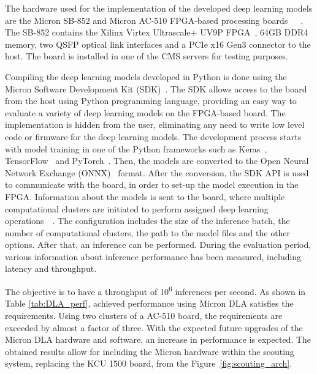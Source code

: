 \documentclass[10pt, paper=a4, UKenglish]{article}
\begin{document}
The hardware used for the implementation of the developed deep learning models are the Micron SB-852 and Micron AC-510 FPGA-based processing boards~\cite{micron_company}~\cite{micron_sb852}~\cite{micron_ac510}. The SB-852 contains the Xilinx Virtex Ultrascale+ UV9P FPGA~\cite{vu9p}, 64GB DDR4 memory, two QSFP optical link interfaces and a PCIe x16 Gen3 connector to the host. The board is installed in one of the CMS servers for testing purposes.

Compiling the deep learning models developed in Python is done using the Micron Software Development Kit (SDK)~\cite{micron_sdk}. The SDK allows access to the board from the host using Python programming language, providing an easy way to evaluate a variety of deep learning models on the FPGA-based board. The implementation is hidden from the user, eliminating any need to write low level code or firmware for the deep learning models. The development process starts with model training in one of the Python frameworks such as Keras~\cite{keras}, TensorFlow~\cite{tf} and PyTorch~\cite{pytorch}. Then, the models are converted to the Open Neural Network Exchange (ONNX)~\cite{onnx} format. After the conversion, the SDK API is used to communicate with the board, in order to set-up the model execution in the FPGA. Information about the models is sent to the board, where multiple computational clusters are initiated to perform assigned deep learning operations~\cite{mircon_paper_1}~\cite{mircon_paper_2}. The configuration includes the size of the inference batch, the number of computational clusters, the path to the model files and the other options. After that, an inference can be performed. During the evaluation period, various information about inference performance has been measured, including latency and throughput.

The objective is to have a throughput of 10\textsuperscript{6} inferences per second. As shown in Table \ref{tab:DLA_perf}, achieved performance using Micron DLA satisfies the requirements. Using two clusters of a AC-510 board, the requirements are exceeded by almost a factor of three. With the expected future upgrades of the Micron DLA hardware and software, an increase in performance is expected. The obtained results allow for including the Micron hardware within the scouting system, replacing the KCU 1500 board, from the Figure~\ref{fig:scouting_arch}.
\end{document}
